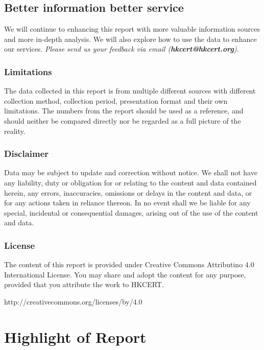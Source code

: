 \documentclass[12pt]{article}
\begin{document}
\subsection*{Better information better service}

We will continue to enhancing this report with more valuable information sources and more in-depth analysis. We will also explore how to use the data to enhance our services. \textit{Please send us your feedback via email (\textbf{hkcert@hkcert.org}).}

\subsubsection*{Limitations}
The data collected in this report is from multiple different sources with different collection method, collection period, presentation format and their own limitations. The numbers from the report should be used as a reference, and should neither be compared directly nor be regarded as a full picture of the reality. 

\subsubsection*{Disclaimer}
Data may be subject to update and correction without notice. We shall not have any liability, duty or obligation for or relating to the content and data contained herein, any errors, inaccuracies, omissions or delays in the content and data, or for any actions taken in reliance thereon.  In no event shall we be liable for any special, incidental or consequential damages, arising out of the use of the content and data.

\subsubsection*{License}
The content of this report is provided under Creative Commons Attributino 4.0 International License. You may share and adopt the content for any purpose, provided that you attribute the work to HKCERT.

http://creativecommons.org/licenses/by/4.0

\newpage
\tableofcontents

\newpage
{}
\section*{Highlight of Report}
\end{document}
